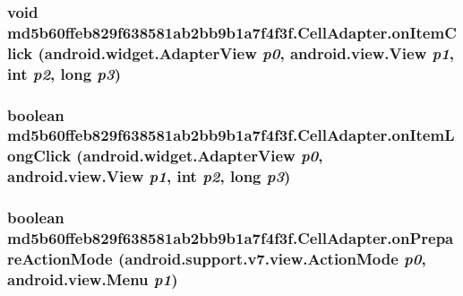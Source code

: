 \hypertarget{classmd5b60ffeb829f638581ab2bb9b1a7f4f3f_1_1_cell_adapter_be81186ab9094ff7ddd3f969e015a2e2}{
\subsubsection[{onItemClick}]{\setlength{\rightskip}{0pt plus 5cm}void md5b60ffeb829f638581ab2bb9b1a7f4f3f.CellAdapter.onItemClick (android.widget.AdapterView {\em p0}, \/  android.view.View {\em p1}, \/  int {\em p2}, \/  long {\em p3})}}
\label{classmd5b60ffeb829f638581ab2bb9b1a7f4f3f_1_1_cell_adapter_be81186ab9094ff7ddd3f969e015a2e2}


\hypertarget{classmd5b60ffeb829f638581ab2bb9b1a7f4f3f_1_1_cell_adapter_6315b61158f9e22013a511c7edd6bcdc}{
\subsubsection[{onItemLongClick}]{\setlength{\rightskip}{0pt plus 5cm}boolean md5b60ffeb829f638581ab2bb9b1a7f4f3f.CellAdapter.onItemLongClick (android.widget.AdapterView {\em p0}, \/  android.view.View {\em p1}, \/  int {\em p2}, \/  long {\em p3})}}
\label{classmd5b60ffeb829f638581ab2bb9b1a7f4f3f_1_1_cell_adapter_6315b61158f9e22013a511c7edd6bcdc}


\hypertarget{classmd5b60ffeb829f638581ab2bb9b1a7f4f3f_1_1_cell_adapter_ba7bba2fe00d346e064e9ff1f742296f}{
\subsubsection[{onPrepareActionMode}]{\setlength{\rightskip}{0pt plus 5cm}boolean md5b60ffeb829f638581ab2bb9b1a7f4f3f.CellAdapter.onPrepareActionMode (android.support.v7.view.ActionMode {\em p0}, \/  android.view.Menu {\em p1})}}
\label{classmd5b60ffeb829f638581ab2bb9b1a7f4f3f_1_1_cell_adapter_ba7bba2fe00d346e064e9ff1f742296f}


